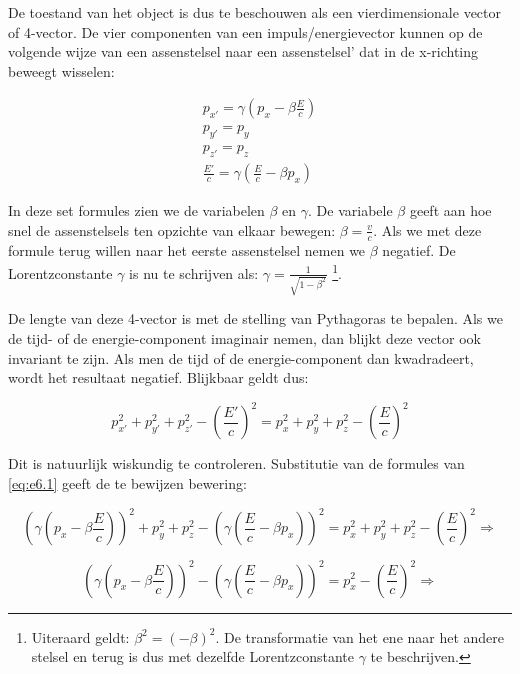 De toestand van het object is dus te beschouwen als een vierdimensionale
vector of 4-vector. De vier componenten van een impuls/energievector
kunnen op de volgende wijze van een assenstelsel naar een assenstelsel'
dat in de x-richting beweegt wisselen:

\begin{equation}
\begin{array}{c}
p_{x'}=\gamma\left(p_{x}-\beta\frac{E}{c}\right)\\
p_{y'}=p_{y}\\
p_{z'}=p_{z}\\
\frac{E'}{c}=\gamma\left(\frac{E}{c}-\beta p_{x}\right)
\end{array}\label{eq:e6.1}
\end{equation}


In deze set formules zien we de variabelen $\beta$ en $\gamma$. De
variabele $\beta$ geeft aan hoe snel de assenstelsels ten opzichte van
elkaar bewegen: $\beta=\frac{v}{c}$. Als we met deze formule terug
willen naar het eerste assenstelsel nemen we $\beta$ negatief. De
Lorentzconstante $\gamma$ is nu te schrijven als:
$\gamma=\frac{1}{\sqrt{1-\beta^{2}}}$ \footnote{Uiteraard geldt:
$\beta^{2}=\left(-\beta\right)^{2}$. De transformatie van het ene naar
het andere stelsel en terug is dus met dezelfde Lorentzconstante
$\gamma$ te beschrijven.}.

De lengte van deze 4-vector is met de stelling van Pythagoras te bepalen.
Als we de tijd- of de energie-component imaginair nemen, dan blijkt
deze vector ook invariant te zijn. Als men de tijd of de energie-component
dan kwadradeert, wordt het resultaat negatief. Blijkbaar geldt dus:

\begin{equation}
p_{x'}^{2}+p_{y'}^{2}+p_{z'}^{2}-\left(\frac{E'}{c}\right)^{2}
=p_{x}^{2}+p_{y}^{2}+p_{z}^{2}-\left(\frac{E}{c}\right)^{2}
\end{equation}


Dit is natuurlijk wiskundig te controleren. Substitutie van de formules
van \ref{eq:e6.1} geeft de te bewijzen bewering:

\begin{equation}
\left(\gamma\left(p_{x}-\beta\frac{E}{c}\right)\right)^{2}+p_{y}^{2}+p_{z}^{2}-\left(\gamma\left(\frac{E}{c}-\beta p_{x}\right)\right)^{2}
=p_{x}^{2}+p_{y}^{2}+p_{z}^{2}-\left(\frac{E}{c}\right)^{2}\Rightarrow
\end{equation}


\begin{equation}
\left(\gamma\left(p_{x}-\beta\frac{E}{c}\right)\right)^{2}-\left(\gamma\left(\frac{E}{c}-\beta p_{x}\right)\right)^{2}
=p_{x}^{2}-\left(\frac{E}{c}\right)^{2}\Rightarrow
\end{equation}


